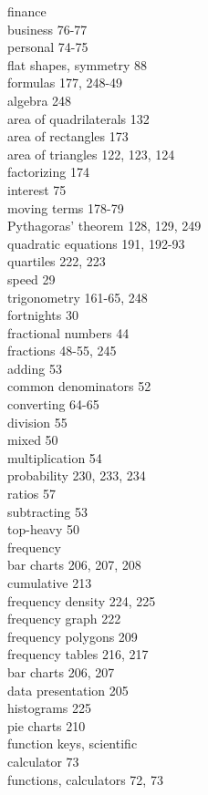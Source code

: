 \documentclass[10pt]{article}
\begin{document}
finance\\
business 76-77\\
personal 74-75\\
flat shapes, symmetry 88\\
formulas 177, 248-49\\
algebra 248\\
area of quadrilaterals 132\\
area of rectangles 173\\
area of triangles 122, 123, 124\\
factorizing 174\\
interest 75\\
moving terms 178-79\\
Pythagoras' theorem 128, 129, 249\\
quadratic equations 191, 192-93\\
quartiles 222, 223\\
speed 29\\
trigonometry 161-65, 248\\
fortnights 30\\
fractional numbers 44\\
fractions 48-55, 245\\
adding 53\\
common denominators 52\\
converting 64-65\\
division 55\\
mixed 50\\
multiplication 54\\
probability 230, 233, 234\\
ratios 57\\
subtracting 53\\
top-heavy 50\\
frequency\\
bar charts 206, 207, 208\\
cumulative 213\\
frequency density 224, 225\\
frequency graph 222\\
frequency polygons 209\\
frequency tables 216, 217\\
bar charts 206, 207\\
data presentation 205\\
histograms 225\\
pie charts 210\\
function keys, scientific\\
calculator 73\\
functions, calculators 72, 73
\end{document}
